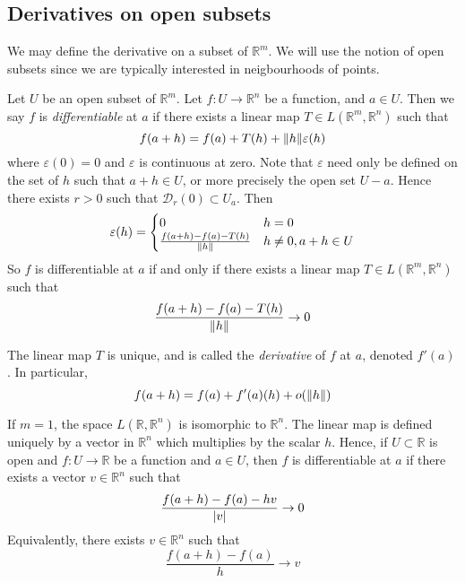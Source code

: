 \subsection{Derivatives on open subsets}
We may define the derivative on a subset of \( \mathbb R^m \).
We will use the notion of open subsets since we are typically interested in neigbourhoods of points.
\begin{definition}
	Let \( U \) be an open subset of \( \mathbb R^m \).
	Let \( f \colon U \to \mathbb R^n \) be a function, and \( a \in U \).
	Then we say \( f \) is \textit{differentiable} at \( a \) if there exists a linear map \( T \in L(\mathbb R^m, \mathbb R^n) \) such that
	\[
		f(a+h) = f(a) + T(h) + \norm{h} \varepsilon(h)
	\]
	where \( \varepsilon(0) = 0 \) and \( \varepsilon \) is continuous at zero.
	Note that \( \varepsilon \) need only be defined on the set of \( h \) such that \( a + h \in U \), or more precisely the open set \( U - a \).
	Hence there exists \( r > 0 \) such that \( \mathcal D_r(0) \subset U_a \).
	Then
	\[
		\varepsilon(h) = \begin{cases}
			0                                     & h = 0                 \\
			\frac{f(a+h) - f(a) - T(h)}{\norm{h}} & h \neq 0, a + h \in U
		\end{cases}
	\]
	So \( f \) is differentiable at \( a \) if and only if there exists a linear map \( T \in L(\mathbb R^m, \mathbb R^n) \) such that
	\[
		\frac{f(a+h) - f(a) - T(h)}{\norm{h}} \to 0
	\]
\end{definition}
\begin{remark}
	The linear map \( T \) is unique, and is called the \textit{derivative} of \( f \) at \( a \), denoted \( f'(a) \).
	In particular,
	\[
		f(a+h) = f(a) + f'(a)(h) + o(\norm{h})
	\]
\end{remark}
\begin{remark}
	If \( m = 1 \), the space \( L(\mathbb R, \mathbb R^n) \) is isomorphic to \( \mathbb R^n \).
	The linear map is defined uniquely by a vector in \( \mathbb R^n \) which multiplies by the scalar \( h \).
	Hence, if \( U \subset \mathbb R \) is open and \( f \colon U \to \mathbb R \) be a function and \( a \in U \), then \( f \) is differentiable at \( a \) if there exists a vector \( v \in \mathbb R^n \) such that
	\[
		\frac{f(a+h) - f(a) - hv}{\abs{v}} \to 0
	\]
	Equivalently, there exists \( v \in \mathbb R^n \) such that
	\[
		\frac{f(a+h) - f(a)}{h} \to v
	\]
\end{remark}

